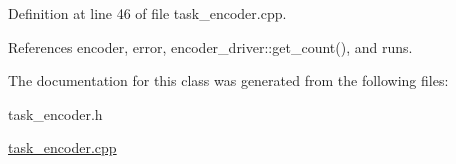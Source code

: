 \-Definition at line 46 of file task\-\_\-encoder.\-cpp.



\-References encoder, error, encoder\-\_\-driver\-::get\-\_\-count(), and runs.



\-The documentation for this class was generated from the following files\-:\begin{DoxyCompactItemize}
\item 
task\-\_\-encoder.\-h\item 
\hyperlink{task__encoder_8cpp}{task\-\_\-encoder.\-cpp}\end{DoxyCompactItemize}
